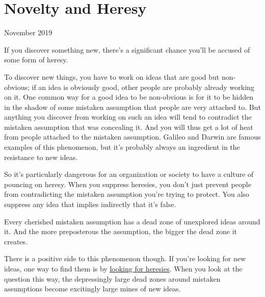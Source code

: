 \chapter{Novelty and Heresy}


            
              
                

November 2019

If you discover something new,
                  there's a significant chance you'll be accused of some form of
                  heresy.

To discover new things, you have to work on
                  ideas that are good but non-obvious; if an idea is obviously
                  good, other people are probably already working on it. One
                  common way for a good idea to be non-obvious is for it to be
                  hidden in the shadow of some mistaken assumption that people
                  are very attached to. But anything you discover from working
                  on such an idea will tend to contradict the mistaken
                  assumption that was concealing it. And you will thus get a lot
                  of heat from people attached to the mistaken assumption.
                  Galileo and Darwin are famous examples of this phenomenon, but
                  it's probably always an ingredient in the resistance to new
                  ideas.

So it's particularly dangerous for an
                  organization or society to have a culture of pouncing on
                  heresy. When you suppress heresies, you don't just prevent
                  people from contradicting the mistaken assumption you're
                  trying to protect. You also suppress any idea that implies
                  indirectly that it's false.
                  

Every cherished mistaken assumption has a dead zone of unexplored
                  ideas around it. And the more preposterous the assumption, the
                  bigger the dead zone it creates.

There is a
                  positive side to this phenomenon though. If you're looking for
                  new ideas, one way to find them is by
                  \href{http://www.paulgraham.com/say.html}{\underline{looking for heresies}}. When you look at the question this way, the depressingly
                  large dead zones around mistaken assumptions become excitingly
                  large mines of new ideas.






              
            
          
